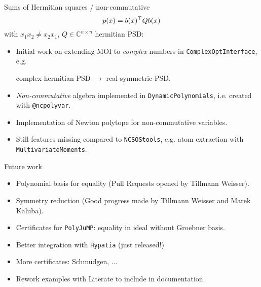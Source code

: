 \documentclass{beamer}
\begin{document}
\begin{frame}{Sums of Hermitian squares / non-commutative}
  \[ p(x) = b(x)^\top Q b(x) \]
  with $x_1x_2 \neq x_2x_1$, $Q \in \mathbb{C}^{n \times n}$ hermitian PSD:
  \begin{itemize}
    \item Initial work on extending MOI to \emph{complex} numbers in \texttt{ComplexOptInterface},
      e.g. \begin{center} \alert{complex} hermitian PSD $\to$ \alert{real} symmetric PSD. \end{center}
    \item \emph{Non-commutative} algebra implemented in \texttt{DynamicPolynomials},
      i.e. created with \texttt{@ncpolyvar}.
    \item Implementation of Newton polytope for non-commutative variables.
    \item Still features missing compared to \texttt{NCSOStools},
      e.g. atom extraction with \texttt{MultivariateMoments}.
  \end{itemize}
\end{frame}

\begin{frame}{Future work}
  \begin{itemize}
    \item Polynomial basis for equality (Pull Requests opened by Tillmann Weisser).
    \item Symmetry reduction (Good progress made by Tillmann Weisser and Marek Kaluba).
    \item Certificates for \texttt{PolyJuMP}: equality in ideal without Groebner basis.
    \item Better integration with \texttt{Hypatia} (just released!)
    \item More certificates: Schm\"{u}dgen, ...
    \item Rework examples with Literate to include in documentation.
  \end{itemize}
\end{frame}
\end{document}
